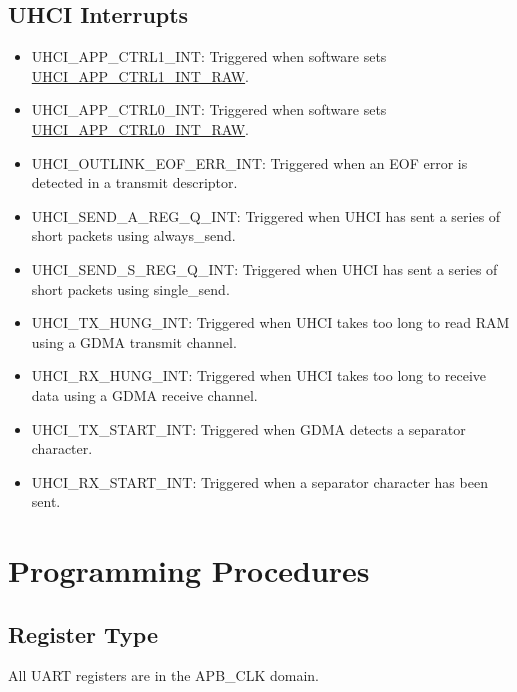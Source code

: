 \documentclass[main\_\_EN.tex]{subfiles}
\begin{document}
\subsection{UHCI Interrupts}
\begin{itemize}
\item \label{int:UHCIAPPCTRL1INT}UHCI\_APP\_CTRL1\_INT: Triggered when software sets \hyperref[fielddesc:UHCIAPPCTRL1INTRAW]{UHCI\_APP\_CTRL1\_INT\_RAW}.
\item \label{int:UHCIAPPCTRL0INT}UHCI\_APP\_CTRL0\_INT: Triggered when software sets \hyperref[fielddesc:UHCIAPPCTRL0INTRAW]{UHCI\_APP\_CTRL0\_INT\_RAW}.
\item \label{int:UHCIOUTLINKEOFERRINT}UHCI\_OUTLINK\_EOF\_ERR\_INT: Triggered when an EOF error is detected in a transmit descriptor.
\item \label{int:UHCISENDAREGQINT}UHCI\_SEND\_A\_REG\_Q\_INT: Triggered when UHCI has sent a series of short packets using always\_send.
\item \label{int:UHCISENDSREGQINT}UHCI\_SEND\_S\_REG\_Q\_INT: Triggered when UHCI has sent a series of short packets using single\_send.
\item \label{int:UHCITXHUNGINT}UHCI\_TX\_HUNG\_INT: Triggered when UHCI takes too long to read RAM using a GDMA transmit channel.
\item \label{int:UHCIRXHUNGINT}UHCI\_RX\_HUNG\_INT: Triggered when UHCI takes too long to receive data using a GDMA receive channel.
\item \label{int:UHCITXSTARTINT}UHCI\_TX\_START\_INT: Triggered when GDMA detects a separator character.
\item \label{int:UHCIRXSTARTINT}UHCI\_RX\_START\_INT: Triggered when a separator character has been sent.
\end{itemize}


\section{Programming Procedures}\label{sec:uart-program}

\subsection{Register Type}

All UART registers are in the APB\_CLK domain.
\end{document}
